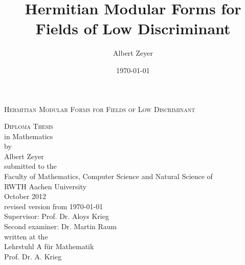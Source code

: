 \documentclass[twoside,openright]{article}
\begin{document}
\title{Hermitian Modular Forms for Fields of Low Discriminant}
\author{Albert Zeyer}
\date{\today}

\begin{titlepage}
\begin{center}
\setlength{\parskip}{2ex plus0.5ex minus0.2ex}
\setlength{\baselineskip}{5ex}
\textsc{\LARGE Hermitian Modular Forms for Fields of Low Discriminant}\\[2cm]

\setlength{\baselineskip}{3ex}

\textsc{Diploma Thesis} \\
in Mathematics \\[0.7cm]

by \\
Albert Zeyer \\[3cm]

submitted to the \\
Faculty of Mathematics, Computer Science and Natural Science of \\
RWTH Aachen University \\[1.5cm]

October 2012 \\
revised version from \today \\[1.5cm]

Supervisor: Prof. Dr. Aloys Krieg \\
Second examiner: Dr. Martin Raum \\[1.5cm]

written at the \\
Lehrstuhl A für Mathematik \\
Prof. Dr. A. Krieg

\end{center}
\end{titlepage}


%
%
%
%
\end{document}
